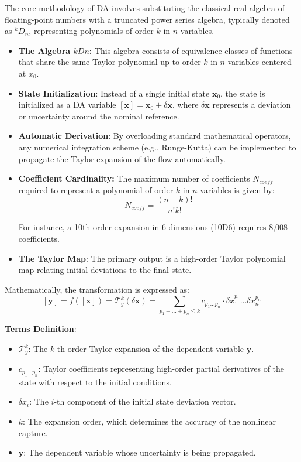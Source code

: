 \documentclass[
  letterpaper,
  DIV=11,
  numbers=noendperiod,
  oneside]{scrartcl}
\begin{document}
The core methodology of DA involves substituting the classical real
algebra of floating-point numbers with a truncated power series algebra,
typically denoted as \(^kD_n\), representing polynomials of order \(k\)
in \(n\) variables.

\begin{itemize}
\item
  \textbf{The Algebra \(kDn\):} This algebra consists of equivalence
  classes of functions that share the same Taylor polynomial up to order
  \(k\) in \(n\) variables centered at \(x_0\).
\item
  \textbf{State Initialization}: Instead of a single initial state
  \(\mathbf{x}_0\), the state is initialized as a DA variable
  \([\mathbf{x}] = \mathbf{x}_0 + \delta\mathbf{x}\), where
  \(\delta\mathbf{x}\) represents a deviation or uncertainty around the
  nominal reference.
\item
  \textbf{Automatic Derivation}: By overloading standard mathematical
  operators, any numerical integration scheme (e.g., Runge-Kutta) can be
  implemented to propagate the Taylor expansion of the flow
  automatically.
\item
  \textbf{Coefficient Cardinality:} The maximum number of coefficients
  \(N_{coeff}\) required to represent a polynomial of order \(k\) in
  \(n\) variables is given by: \[
  N_{coeff} = \frac{(n + k)!}{n!k!}
  \]

  For instance, a 10th-order expansion in 6 dimensions (10D6) requires
  8,008 coefficients.
\item
  \textbf{The Taylor Map}: The primary output is a high-order Taylor
  polynomial map relating initial deviations to the final state.
\end{itemize}

Mathematically, the transformation is expressed as: \[
[\mathbf{y}] = f([\mathbf{x}]) = \mathcal{T}^k_y(\delta \mathbf{x}) = \sum_{p_1 + \dots + p_n \le k} c_{p_1 \dots p_n} \cdot \delta x_1^{p_1} \dots \delta x_n^{p_n} 
\]

\textbf{Terms Definition}:

\begin{itemize}
\item
  \(\mathcal{T}^k_y\): The \(k\)-th order Taylor expansion of the
  dependent variable \(\mathbf{y}\).
\item
  \(c_{p_1 \dots p_n}\): Taylor coefficients representing high-order
  partial derivatives of the state with respect to the initial
  conditions.
\item
  \(\delta x_i\): The \(i\)-th component of the initial state deviation
  vector.
\item
  \(k\): The expansion order, which determines the accuracy of the
  nonlinear capture.
\item
  \(\mathbf{y}\): The dependent variable whose uncertainty is being
  propagated.
\end{itemize}
\end{document}
